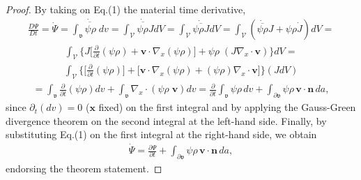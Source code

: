 \begin{proof}
By taking on Eq.(1) the material time derivative,
\begin{align*}
\frac{D\Psi}{Dt}=\dot{\Psi}=\dot{\overline{\int_{\mathfrak{v}}\psi\rho\;dv}}=
\dot{\overline{\int_{\mathscr{V}}\psi\rho{J}dV}}=
\int_{\mathscr{V}}\dot{\overline{\psi\rho{J}}}dV=
\int_{\mathscr{V}}(\dot{\overline{\psi\rho}}J+\psi\rho\dot{J})dV=
\end{align*}
\begin{align*}
\int_{\mathscr{V}}\Big\{J\Big[\frac{\partial}{\partial{t}}(\psi\rho)+
\mathbf{v}\!\cdot\!\nabla_x(\psi\rho)\Big]+
\psi\rho\;(J\nabla_x\!\cdot\!\mathbf{v})\Big\}dV=
\end{align*}
\begin{align*}
\int_{\mathscr{V}}\Big\{\Big[\frac{\partial}{\partial{t}}(\psi\rho)\Big]
+\big[\mathbf{v}\!\cdot\!\nabla_x(\psi\rho)+
(\psi\rho)\nabla_x\!\cdot\!\mathbf{v}\big]\Big\}(JdV)
\end{align*}
\begin{align*}
=\int_{\mathfrak{v}}\frac{\partial}{\partial{t}}(\psi\rho)dv+
\int_{\mathfrak{v}}\nabla_x\!\cdot\!(\psi\rho\;\mathbf{v})dv=
\frac{\partial}{\partial{t}}\int_{\mathfrak{v}}\psi\rho\,dv+
\int_{\partial\mathfrak{v}}\psi\rho\,\mathbf{v}\!\cdot\!\mathbf{n}\,da,
\end{align*}
since $\partial_t(dv)=0$ ($\mathbf{x}$ fixed) on the first integral and by applying the Gauss-Green divergence theorem on the second integral at the left-hand side. Finally, by substituting Eq.(1) on the first integral at the right-hand side, we obtain
\begin{align}
\dot{\Psi}=\frac{\partial\Psi}{\partial{t}}+
\int_{\partial\mathfrak{v}}\psi\rho\,\mathbf{v}\!\cdot\!\mathbf{n}\,da,
\end{align}
endorsing the theorem statement.
\end{proof}
